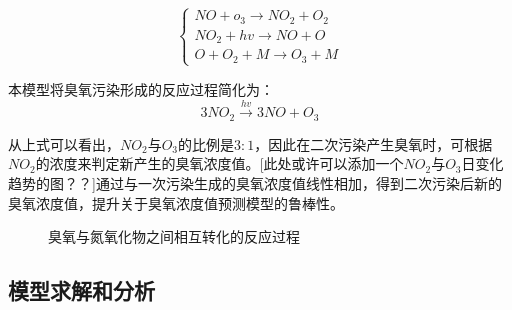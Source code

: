 \documentclass[a4paper,10pt]{my_paper}
\numberwithin{equation}{section}
\begin{document}
\begin{equation}
    \label{eq6}
    \left\{
    \begin{aligned}
        NO + o_3 \longrightarrow NO_2 + O_2\\
        NO_2 + hv \longrightarrow NO + O\\
        O + O_2 + M \longrightarrow O_3 + M
    \end{aligned}
    \right.
\end{equation}

本模型将臭氧污染形成的反应过程简化为：
\begin{equation}
    3NO_2\stackrel{hv}{\longrightarrow}3NO + O_3
\end{equation}

从上式可以看出，${NO_2}$与${O_3}$的比例是${3:1}$，因此在二次污染产生臭氧时，可根据${NO_2}$的浓度来判定新产生的臭氧浓度值。{\color{red}[此处或许可以添加一个${NO_2}$与${O_3}$日变化趋势的图？？]}通过与一次污染生成的臭氧浓度值线性相加，得到二次污染后新的臭氧浓度值，提升关于臭氧浓度值预测模型的鲁棒性。

\begin{figure}[htbp]
  \caption{臭氧与氮氧化物之间相互转化的反应过程}\label{fig_O3}
\end{figure}


\subsection{模型求解和分析}
\end{document}
